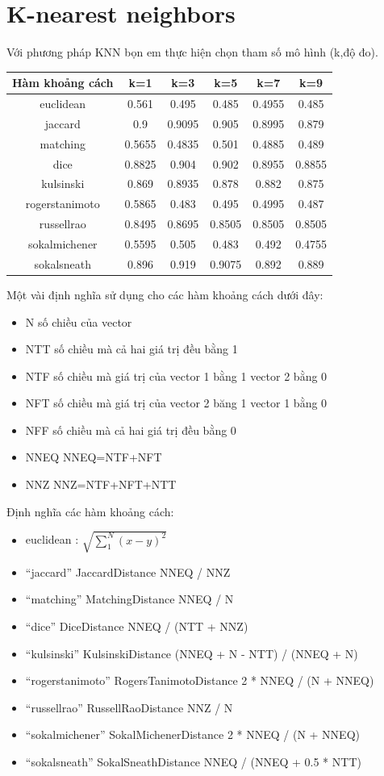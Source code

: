 \documentclass[a4paper,12pt]{report}
\begin{document}
\section{K-nearest neighbors}
Với phương pháp KNN bọn em thực hiện chọn tham số mô hình (k,độ đo). 
\begin{longtable}{|c|c|c|c|c|c|}
\hline
Hàm khoảng cách & k=1 & k=3 & k=5 & k=7 & k=9\\
\hline
euclidean & 0.561 &0.495 &0.485&0.4955&0.485 \\
\hline 
jaccard & 0.9 & 0.9095 & 0.905 & 0.8995 & 0.879 \\ \hline
matching & 0.5655 & 0.4835 &  0.501 &0.4885 & 0.489 \\ \hline 
dice &0.8825 & 0.904 & 0.902 & 0.8955 & 0.8855 \\ \hline
kulsinski&  0.869 &0.8935& 0.878& 0.882 &0.875 \\ \hline 
rogerstanimoto&  0.5865& 0.483& 0.495 &0.4995& 0.487 \\ \hline
russellrao&  0.8495& 0.8695& 0.8505  &0.8505& 0.8505 \\ \hline 
sokalmichener& 0.5595& 0.505 &0.483 &0.492 &0.4755 \\ \hline 
sokalsneath& 0.896& 0.919  & 0.9075& 0.892 & 0.889 \\ \hline
\end{longtable}

Một vài định nghĩa sử dụng cho các hàm khoảng cách dưới đây:
\begin{itemize}
\item N số chiều của vector
\item NTT số chiều mà cả hai giá trị đều bằng 1
\item NTF số chiều mà giá trị của vector 1 bằng 1 vector 2 bằng 0
\item NFT số chiều mà giá trị của vector 2 băng 1 vector 1 bằng 0
\item NFF số chiều mà cả hai giá trị đều bằng 0
\item NNEQ NNEQ=NTF+NFT
\item NNZ NNZ=NTF+NFT+NTT 
\end{itemize}
Định nghĩa các hàm khoảng cách:
\begin{itemize}
\item euclidean : $\sqrt{\sum_1^N (x-y)^2}$
\item “jaccard”	JaccardDistance	NNEQ / NNZ
\item “matching”	MatchingDistance	NNEQ / N
\item “dice”	DiceDistance	NNEQ / (NTT + NNZ)
\item “kulsinski”	KulsinskiDistance	(NNEQ + N - NTT) / (NNEQ + N)\item “rogerstanimoto”	RogersTanimotoDistance	2 * NNEQ / (N + NNEQ)
\item “russellrao”	RussellRaoDistance	NNZ / N
\item “sokalmichener”	SokalMichenerDistance	2 * NNEQ / (N + NNEQ)
\item “sokalsneath”	SokalSneathDistance	NNEQ / (NNEQ + 0.5 * NTT)
\end{itemize}
\begin{thebibliography}{9}


\end{thebibliography}
\end{document}
